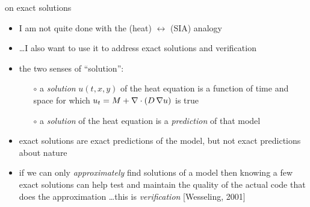 \begin{frame}{on exact solutions}

\begin{itemize}
\item I am not quite done with the (heat) $\leftrightarrow$ (SIA) analogy
\item \dots I also want to use it to address exact solutions and verification

\bigskip
\item the two senses of ``solution'':
  \begin{itemize}
  \small
  \item[$\circ$] a \emph{solution} $u(t,x,y)$ of the heat equation is a function of time and space for which $u_t = M + \nabla\cdot (D\, \nabla u)$ is true
  \item[$\circ$] a \emph{solution} of the heat equation is a \emph{prediction} of that model
  \normalsize
  \end{itemize}
\item exact solutions are exact predictions of the model, but not exact predictions about nature
\item if we can only \emph{approximately} find solutions of a model then knowing a few exact solutions can help test and maintain the quality of the actual code that does the approximation \dots this is \emph{verification} [Wesseling, 2001]\nocite{Wesseling}
\end{itemize}
\end{frame}


